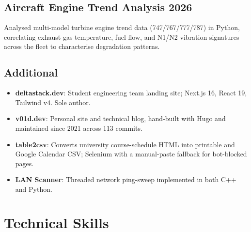 \documentclass[10pt,a4paper]{article}
\begin{document}
\subsection*{Aircraft Engine Trend Analysis \hfill 2026}
Analysed multi-model turbine engine trend data (747/767/777/787) in Python,
correlating exhaust gas temperature, fuel flow, and N1/N2 vibration signatures
across the fleet to characterise degradation patterns.

\subsection*{Additional}
\begin{itemize}
    \item \textbf{deltastack.dev}: Student engineering team landing site; Next.js 16, React 19, Tailwind v4. Sole author.
    \item \textbf{v01d.dev}: Personal site and technical blog, hand-built with Hugo and maintained since 2021 across 113 commits.
    \item \textbf{table2csv}: Converts university course-schedule HTML into printable and Google Calendar CSV; Selenium with a manual-paste fallback for bot-blocked pages.
    \item \textbf{LAN Scanner}: Threaded network ping-sweep implemented in both C++ and Python.
\end{itemize}


\section*{Technical Skills}
\end{document}
